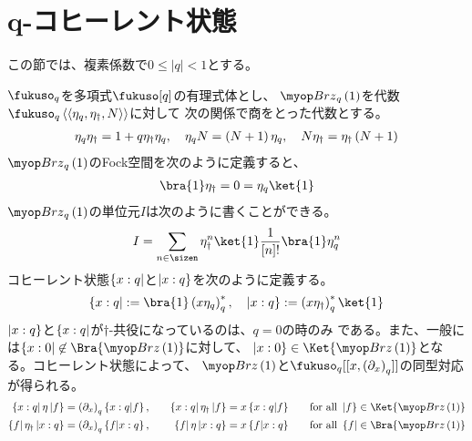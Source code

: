 \newcommand{\lcbraket}[1]{\mathinner{\{{#1}\rangle}}
\newcommand{\rcbraket}[1]{\mathinner{\langle{#1}\}}}
\newcommand{\dbra}[1]{\mathinner{\langle\langle{#1}|}}
\newcommand{\dket}[1]{\mathinner{|{#1}\rangle\rangle}}
\newcommand{\dbraket}[1]{\mathinner{\langle\langle{#1}\rangle\rangle}}
%
{\setlength\arraycolsep{2pt}
%
\section{q-コヒーレント状態}\label{s1:q-コヒーレント状態} %
	この節では、複素係数で$0\le|q|<1$とする。

	$\fukuso_q$を多項式$\fukuso[q]$の有理式体とし、
	$\Brz_q\lr{1}$を代数$\fukuso_q\dbraket{\eta_q,\eta_\dag,N}$に対して
	次の関係で商をとった代数とする。
	\begin{equation*}\begin{split}
		\eta_q\eta_\dag = 1 + q\eta_\dag\eta_q
		,\quad \eta_qN = \left({N + 1}\right)\eta_q
		,\quad N\eta_\dag = \eta_\dag\left({N + 1}\right)
	\end{split}\end{equation*}
	$\Brz_q\lr{1}$のFock空間を次のように定義すると、
	\begin{equation*}\begin{split}
		\bra{1}\eta_\dag = 0 = \eta_q\ket{1}
	\end{split}\end{equation*}
	$\Brz_q\lr{1}$の単位元$I$は次のように書くことができる。
	\begin{equation*}\begin{split}
		I = \sum_{n\in\sizen}\eta_\dag^n\ket{1}\frac{1}{[n]!}\bra{1}\eta_q^n
	\end{split}\end{equation*}
	コヒーレント状態$\mathinner{\{{x:q}|}$と$\mathinner{|{x:q}\}}$を次のように定義する。
	\begin{equation*}\begin{split}
		\cbra{x:q} := \bra{1}\lr{x\eta_q}_q^*
		,\quad \cket{x:q} := \lr{x\eta_\dag}_q^*\ket{1}
	\end{split}\end{equation*}
	$\mathinner{|{x:q}\}}$と$\mathinner{\{{x:q}|}$が$\dag$-共役になっているのは、$q=0$の時のみ
	である。また、一般には$\cbra{x:0}\not\in\Bra{\Brz\lr{1}}$に対して、
	$\cket{x:0}\in\Ket{\Brz\lr{1}}$となる。コヒーレント状態によって、
	$\Brz\lr{1}$と$\fukuso_q[[x,\lr{\partial_x}_q]]$の同型対応が得られる。
	\begin{alignat*}{3}
		\cbra{x:q}\eta\cket{f} &= \lr{\partial_x}_q\cbraket{x:q|f}
		,\quad& \cbra{x:q}\eta_\dag\cket{f} &= x\cbraket{x:q|f} 
		&\quad& \text{for all } \cket{f}\in\Ket{\Brz\lr{1}} \\
		\cbra{f}\eta_\dag\cket{x:q} &= \lr{\partial_x}_q\cbraket{f|x:q} 
		,\quad& \cbra{f}\eta\cket{x:q} &= x\cbraket{f|x:q}
		&\quad& \text{for all } \cbra{f}\in\Bra{\Brz\lr{1}}
	\end{alignat*}

}
